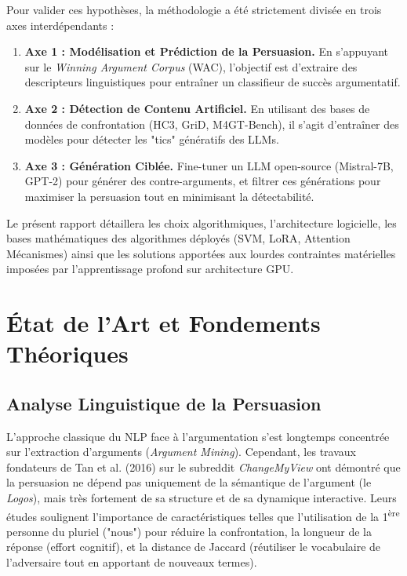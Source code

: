 \documentclass[11pt,a4paper]{article}
\begin{document}
Pour valider ces hypothèses, la méthodologie a été strictement divisée en trois axes interdépendants :

\begin{enumerate}
    \item \textbf{Axe 1 : Modélisation et Prédiction de la Persuasion.} En s'appuyant sur le \textit{Winning Argument Corpus} (WAC), l'objectif est d'extraire des descripteurs linguistiques pour entraîner un classifieur de succès argumentatif.
    \item \textbf{Axe 2 : Détection de Contenu Artificiel.} En utilisant des bases de données de confrontation (HC3, GriD, M4GT-Bench), il s'agit d'entraîner des modèles pour détecter les "tics" génératifs des LLMs.
    \item \textbf{Axe 3 : Génération Ciblée.} Fine-tuner un LLM open-source (Mistral-7B, GPT-2) pour générer des contre-arguments, et filtrer ces générations pour maximiser la persuasion tout en minimisant la détectabilité.
\end{enumerate}

Le présent rapport détaillera les choix algorithmiques, l'architecture logicielle, les bases mathématiques des algorithmes déployés (SVM, LoRA, Attention Mécanismes) ainsi que les solutions apportées aux lourdes contraintes matérielles imposées par l'apprentissage profond sur architecture GPU.


\section{État de l'Art et Fondements Théoriques}

\subsection{Analyse Linguistique de la Persuasion}
L'approche classique du NLP face à l'argumentation s'est longtemps concentrée sur l'extraction d'arguments (\textit{Argument Mining}). Cependant, les travaux fondateurs de Tan et al. (2016) sur le subreddit \textit{ChangeMyView} ont démontré que la persuasion ne dépend pas uniquement de la sémantique de l'argument (le \textit{Logos}), mais très fortement de sa structure et de sa dynamique interactive. Leurs études soulignent l'importance de caractéristiques telles que l'utilisation de la 1\textsuperscript{ère} personne du pluriel ("nous") pour réduire la confrontation, la longueur de la réponse (effort cognitif), et la distance de Jaccard (réutiliser le vocabulaire de l'adversaire tout en apportant de nouveaux termes).
\end{document}
